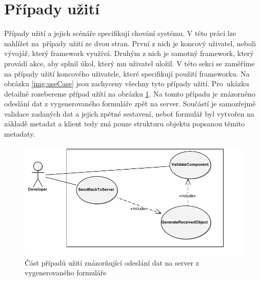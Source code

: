 \section{Případy užití}
Případy užití a jejich scénáře \cite{UmlArlow} specifikují chování systému. V této práci lze nahlížet na~případy užití ze dvou stran. První z nich je koncový uživatel, neboli vývojář, který framework využívá. Druhým z nich je samotný framework, který provádí akce, aby splnil úkol, který mu uživatel uložil. V této sekci se zaměříme na případy užití koncového uživatele, které specifikují použití frameworku. Na obrázku \ref{img:useCase} jsou zachyceny všechny tyto případy užití. Pro~ukázku detailně rozebereme případ užítí na obrázku \ref{img:useCaseSmall}. Na tomto případu je znázorněno odeslání dat z vygenerovaného formuláře zpět na server. Součástí je samozřejmě validace zadaných dat a jejich zpětné sestavení, neboť formulář byl vytvořen na základě metadat a klient tedy zná pouze strukturu objektu popsanou těmito metadaty. 
\begin{figure}[h!]
\begin{center}
\includegraphics{images/useCaseSmall}
\caption{Část případů užití znázorňující odeslání dat na server z vygenerovaného formuláře}
\label{img:useCaseSmall}
\end{center}
\end{figure}
